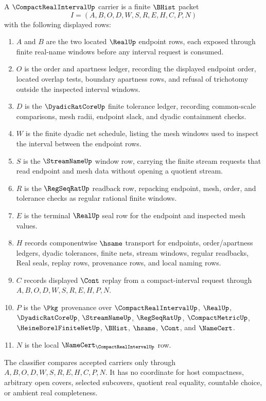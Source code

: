 \begin{definition}
\label{def:compact-real-interval-carrier}
A $\CompactRealIntervalUp$ carrier is a finite $\BHist$ packet
$$
I=(A,B,O,D,W,S,R,E,H,C,P,N)
$$
with the following displayed rows:
\begin{enumerate}
\item $A$ and $B$ are the two located $\RealUp$ endpoint rows, each exposed through finite real-name windows before any interval request is consumed.
\item $O$ is the order and apartness ledger, recording the displayed endpoint order, located overlap tests, boundary apartness rows, and refusal of trichotomy outside the inspected interval windows.
\item $D$ is the $\DyadicRatCoreUp$ finite tolerance ledger, recording common-scale comparisons, mesh radii, endpoint slack, and dyadic containment checks.
\item $W$ is the finite dyadic net schedule, listing the mesh windows used to inspect the interval between the endpoint rows.
\item $S$ is the $\StreamNameUp$ window row, carrying the finite stream requests that read endpoint and mesh data without opening a quotient stream.
\item $R$ is the $\RegSeqRatUp$ readback row, repacking endpoint, mesh, order, and tolerance checks as regular rational finite windows.
\item $E$ is the terminal $\RealUp$ seal row for the endpoint and inspected mesh values.
\item $H$ records componentwise $\hsame$ transport for endpoints, order/apartness ledgers, dyadic tolerances, finite nets, stream windows, regular readbacks, Real seals, replay rows, provenance rows, and local naming rows.
\item $C$ records displayed $\Cont$ replay from a compact-interval request through $A,B,O,D,W,S,R,E,H,P,N$.
\item $P$ is the $\Pkg$ provenance over $\CompactRealIntervalUp$, $\RealUp$, $\DyadicRatCoreUp$, $\StreamNameUp$, $\RegSeqRatUp$, $\CompactMetricUp$, $\HeineBorelFiniteNetUp$, $\BHist$, $\hsame$, $\Cont$, and $\NameCert$.
\item $N$ is the local $\NameCert_{\CompactRealIntervalUp}$ row.
\end{enumerate}
The classifier compares accepted carriers only through $A,B,O,D,W,S,R,E,H,C,P,N$. It has no coordinate for host compactness, arbitrary open covers, selected subcovers, quotient real equality, countable choice, or ambient real completeness.
\end{definition}


